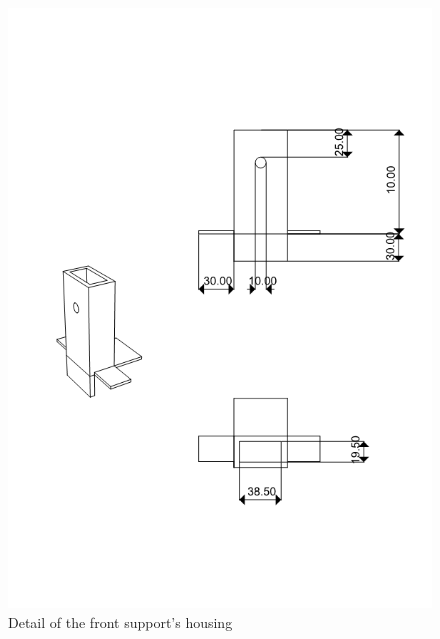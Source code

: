 \begin{figure}[h]
\centering
\includegraphics[width=15cm]{images/MastroMedidas2.png}
\caption{Detail of the front support's housing}
\label{fig:housing}
\end{figure}

